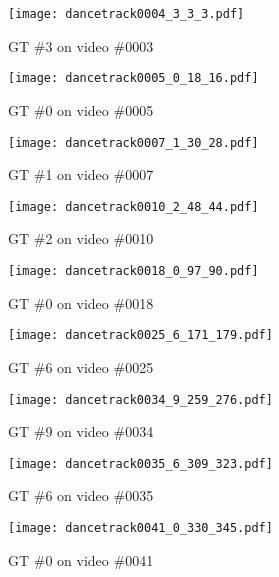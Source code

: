 \documentclass[10pt,twocolumn,letterpaper]{article}
\begin{document}
\begin{figure*}[t]
\vspace{-0.2cm}
\setlength{\abovecaptionskip}{0.cm}
  \begin{subfigure}[t]{.31\textwidth}
    \centering
    \texttt{[image: dancetrack0004\_3\_3\_3.pdf]}
    \caption{GT  \#3 on video \#0003}
  \end{subfigure}
  \hfill
  \begin{subfigure}[t]{.31\textwidth}
    \centering
    \texttt{[image: dancetrack0005\_0\_18\_16.pdf]}
    \caption{GT  \#0 on video \#0005}
  \end{subfigure}
    \hfill
     \begin{subfigure}[t]{.31\textwidth}
    \centering
    \texttt{[image: dancetrack0007\_1\_30\_28.pdf]}
    \caption{GT  \#1 on video \#0007}
  \end{subfigure}
  
  \medskip
  \begin{subfigure}[t]{.31\textwidth}
    \centering
    \texttt{[image: dancetrack0010\_2\_48\_44.pdf]}
    \caption{GT  \#2 on video \#0010}
  \end{subfigure}
    \hfill 
  \begin{subfigure}[t]{.31\textwidth}
    \centering
    \texttt{[image: dancetrack0018\_0\_97\_90.pdf]}
    \caption{GT  \#0 on video \#0018}
  \end{subfigure}
  \hfill
  \begin{subfigure}[t]{.31\textwidth}
    \centering
    \texttt{[image: dancetrack0025\_6\_171\_179.pdf]}
    \caption{GT  \#6 on video \#0025}
  \end{subfigure}

  \medskip
  \begin{subfigure}[t]{.31\textwidth}
    \centering
    \texttt{[image: dancetrack0034\_9\_259\_276.pdf]}
    \caption{GT  \#9 on video \#0034}
  \end{subfigure}
    \hfill 
  \begin{subfigure}[t]{.31\textwidth}
    \centering
    \texttt{[image: dancetrack0035\_6\_309\_323.pdf]}
    \caption{GT  \#6 on video \#0035}
  \end{subfigure}
  \hfill
  \begin{subfigure}[t]{.31\textwidth}
    \centering
    \texttt{[image: dancetrack0041\_0\_330\_345.pdf]}
    \caption{GT  \#0 on video \#0041}
  \end{subfigure}
  

\end{figure*}
\end{document}
